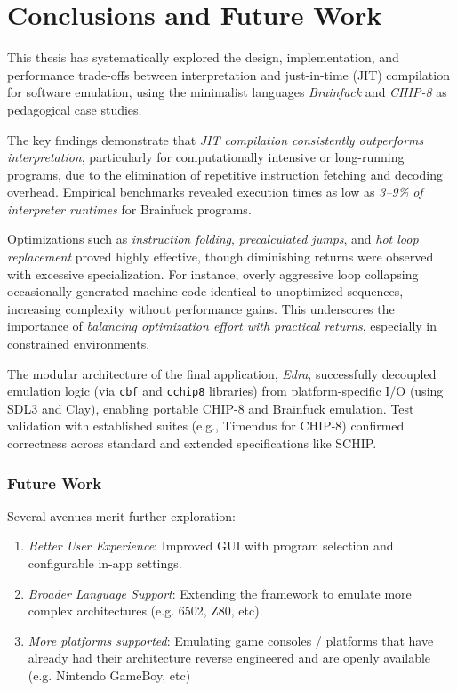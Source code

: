 \clearpage

\chapter{Conclusions and Future Work}
\label{conclusions}

\par This thesis has systematically explored the design, implementation, and performance trade-offs between interpretation and just-in-time (JIT) compilation for software emulation, using the minimalist languages \textit{Brainfuck} and \textit{CHIP-8} as pedagogical case studies.

\par The key findings demonstrate that \textit{JIT compilation consistently outperforms interpretation}, particularly for computationally intensive or long-running programs, due to the elimination of repetitive instruction fetching and decoding overhead. Empirical benchmarks revealed execution times as low as \textit{3--9\% of interpreter runtimes} for Brainfuck programs.

\par Optimizations such as \textit{instruction folding}, \textit{precalculated jumps}, and \textit{hot loop replacement} proved highly effective, though diminishing returns were observed with excessive specialization. For instance, overly aggressive loop collapsing occasionally generated machine code identical to unoptimized sequences, increasing complexity without performance gains. This underscores the importance of \textit{balancing optimization effort with practical returns}, especially in constrained environments.

\par The modular architecture of the final application, \textit{Edra}, successfully decoupled emulation logic (via \texttt{cbf} and \texttt{cchip8} libraries) from platform-specific I/O (using SDL3 and Clay), enabling portable CHIP-8 and Brainfuck emulation. Test validation with established suites (e.g., Timendus\cite{CHIP8Timendus} for CHIP-8) confirmed correctness across standard and extended specifications like SCHIP.

\subsection*{Future Work}

\par Several avenues merit further exploration:

\begin{enumerate}
    \item \textit{Better User Experience}: Improved GUI with program selection and configurable in-app settings.
    \item \textit{Broader Language Support}: Extending the framework to emulate more complex architectures (e.g. 6502, Z80, etc).
    \item \textit{More platforms supported}: Emulating game consoles / platforms that have already had their architecture reverse engineered and are openly available (e.g. Nintendo GameBoy, etc)
\end{enumerate}